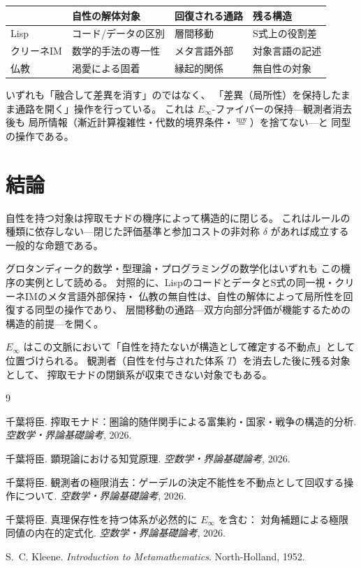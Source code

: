 \documentclass[11pt,a4paper]{article}
\theoremstyle{definition}
\newcommand{\mweq}{\mathrel{\overset{\mathrm{mw}}{=}}}
\newcommand{\Einfty}{E_\infty}
\begin{document}
\begin{center}
\begin{tabular}{llll}
\hline
& \textbf{自性の解体対象} & \textbf{回復される通路} & \textbf{残る構造} \\
\hline
Lisp & コード/データの区別 & 層間移動 & S式上の役割差 \\
クリーネIM & 数学的手法の専一性 & メタ言語外部 & 対象言語の記述 \\
仏教 & 渇愛による固着 & 縁起的関係 & 無自性の対象 \\
\hline
\end{tabular}
\end{center}

いずれも「融合して差異を消す」のではなく、
「差異（局所性）を保持したまま通路を開く」操作を行っている。
これは $\Einfty$-ファイバーの保持---観測者消去後も
局所情報（漸近計算複雑性・代数的境界条件・$\mweq$）を捨てない---と
同型の操作である。

\section{結論}

自性を持つ対象は搾取モナドの機序によって構造的に閉じる。
これはルールの種類に依存しない---閉じた評価基準と参加コストの非対称
$\delta$ があれば成立する一般的な命題である。

グロタンディーク的数学・型理論・プログラミングの数学化はいずれも
この機序の実例として読める。
対照的に、LispのコードとデータとS式の同一視・クリーネIMのメタ言語外部保持・
仏教の無自性は、自性の解体によって局所性を回復する同型の操作であり、
层間移動の通路---双方向部分評価が機能するための構造的前提---を開く。

$\Einfty$ はこの文脈において「自性を持たないが構造として確定する不動点」として位置づけられる。
観測者（自性を付与された体系 $T$）を消去した後に残る対象として、
搾取モナドの閉鎖系が収束できない対象でもある。

\begin{thebibliography}{9}

千葉将臣.
\newblock 搾取モナド：圏論的随伴関手による富集約・国家・戦争の構造的分析.
\newblock \emph{空数学・界論基礎論考}, 2026.

千葉将臣.
\newblock 顕現論における知覚原理.
\newblock \emph{空数学・界論基礎論考}, 2026.

千葉将臣.
\newblock 観測者の極限消去：ゲーデルの決定不能性を不動点として回収する操作について.
\newblock \emph{空数学・界論基礎論考}, 2026.

千葉将臣.
\newblock 真理保存性を持つ体系が必然的に $E_\infty$ を含む：
対角補題による極限同値の内在的定式化.
\newblock \emph{空数学・界論基礎論考}, 2026.

S.~C. Kleene.
\newblock \emph{Introduction to Metamathematics}.
\newblock North-Holland, 1952.

\end{thebibliography}
\end{document}
